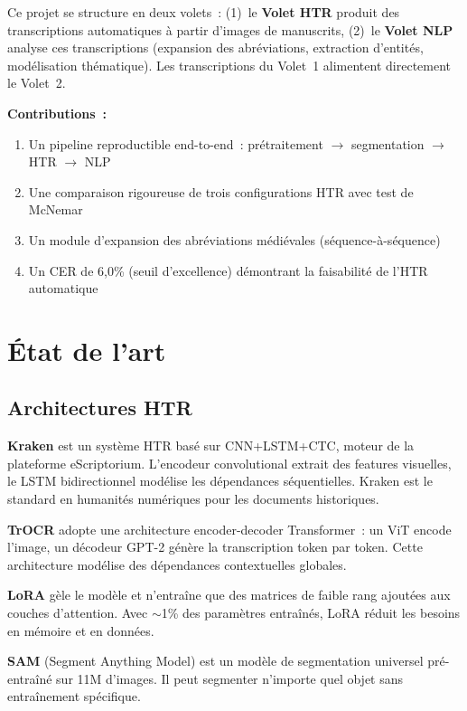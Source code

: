 \documentclass[11pt,a4paper]{article}
\begin{document}
Ce projet se structure en deux volets~: (1)~le \textbf{Volet HTR} produit des transcriptions automatiques à partir d'images de manuscrits, (2)~le \textbf{Volet NLP} analyse ces transcriptions (expansion des abréviations, extraction d'entités, modélisation thématique). Les transcriptions du Volet~1 alimentent directement le Volet~2.

\textbf{Contributions~:}
\begin{enumerate}[leftmargin=*, itemsep=2pt]
\item Un pipeline reproductible end-to-end~: prétraitement $\rightarrow$ segmentation $\rightarrow$ HTR $\rightarrow$ NLP
\item Une comparaison rigoureuse de trois configurations HTR avec test de McNemar
\item Un module d'expansion des abréviations médiévales (séquence-à-séquence)
\item Un CER de 6,0\% (seuil d'excellence) démontrant la faisabilité de l'HTR automatique
\end{enumerate}

\section{État de l'art}

\subsection{Architectures HTR}

\textbf{Kraken} \cite{kiessling2019} est un système HTR basé sur CNN+LSTM+CTC, moteur de la plateforme eScriptorium. L'encodeur convolutional extrait des features visuelles, le LSTM bidirectionnel modélise les dépendances séquentielles. Kraken est le standard en humanités numériques pour les documents historiques.

\textbf{TrOCR} \cite{li2023} adopte une architecture encoder-decoder Transformer~: un ViT encode l'image, un décodeur GPT-2 génère la transcription token par token. Cette architecture modélise des dépendances contextuelles globales.

\textbf{LoRA} \cite{hu2022} gèle le modèle et n'entraîne que des matrices de faible rang ajoutées aux couches d'attention. Avec $\sim$1\% des paramètres entraînés, LoRA réduit les besoins en mémoire et en données.

\textbf{SAM} \cite{kirillov2023} (Segment Anything Model) est un modèle de segmentation universel pré-entraîné sur 11M d'images. Il peut segmenter n'importe quel objet sans entraînement spécifique.
\end{document}
